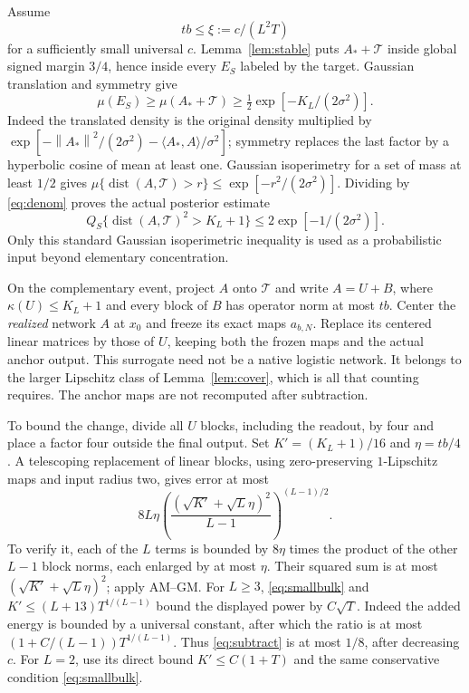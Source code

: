 \documentclass[11pt]{article}
\theoremstyle{remark}\newtheorem{remark}[theorem]{Remark}
\newcommand{\norm}[1]{\left\lVert #1\right\rVert}
\begin{document}
Assume
\begin{equation}\label{eq:smallbulk}
 tb\le\xi:=c/(L^2T)
\end{equation}
for a sufficiently small universal $c$. Lemma~\ref{lem:stable} puts
$A_*+\mathcal T$ inside global signed margin $3/4$, hence inside every
$E_S$ labeled by the target. Gaussian translation and symmetry give
\begin{equation}\label{eq:denom}
 \mu(E_S)\ge\mu(A_*+\mathcal T)
 \ge\tfrac12\exp[-K_L/(2\sigma^2)].
\end{equation}
Indeed the translated density is the original density multiplied by
$\exp[-\norm{A_*}^2/(2\sigma^2)-\langle A_*,A\rangle/\sigma^2]$;
symmetry replaces the last factor by a hyperbolic cosine of mean at least
one. Gaussian isoperimetry for a set of mass at least $1/2$ gives
$\mu\{\operatorname{dist}(A,\mathcal T)>r\}\le\exp[-r^2/(2\sigma^2)]$.
Dividing by \eqref{eq:denom} proves the actual posterior estimate
\begin{equation}\label{eq:distance}
 Q_S\{\operatorname{dist}(A,\mathcal T)^2>K_L+1\}
 \le2\exp[-1/(2\sigma^2)].
\end{equation}
Only this standard Gaussian isoperimetric inequality is used as a
probabilistic input beyond elementary concentration.

On the complementary event, project $A$ onto $\mathcal T$ and write
$A=U+B$, where $\kappa(U)\le K_L+1$ and every block of $B$ has operator
norm at most $tb$. Center the \emph{realized} network $A$ at $x_0$ and
freeze its exact maps $a_{b,N}$. Replace its centered linear matrices by
those of $U$, keeping both the frozen maps and the actual anchor output.
This surrogate need not be a native logistic network. It belongs to the
larger Lipschitz class of Lemma~\ref{lem:cover}, which is all that counting
requires. The anchor maps are not recomputed after subtraction.

To bound the change, divide all $U$ blocks, including the readout, by four
and place a factor four outside the final output. Set
$K'=(K_L+1)/16$ and $\eta=tb/4$. A telescoping replacement of linear
blocks, using zero-preserving $1$-Lipschitz maps and input radius two,
gives error at most
\begin{equation}\label{eq:subtract}
 8L\eta
 \left(\frac{(\sqrt{K'}+\sqrt L\eta)^2}{L-1}\right)^{(L-1)/2}.
\end{equation}
To verify it, each of the $L$ terms is bounded by $8\eta$ times the
product of the other $L-1$ block norms, each enlarged by at most $\eta$.
Their squared sum is at most $(\sqrt{K'}+\sqrt L\eta)^2$; apply AM--GM.
For $L\ge3$, \eqref{eq:smallbulk} and
$K'\le(L+13)T^{1/(L-1)}$ bound the displayed power by $C\sqrt T$.
Indeed the added energy is bounded by a universal constant, after which
the ratio is at most $(1+C/(L-1))T^{1/(L-1)}$.
Thus \eqref{eq:subtract} is at most $1/8$, after decreasing $c$.
For $L=2$, use its direct bound $K'\le C(1+T)$ and the same conservative
condition \eqref{eq:smallbulk}.
\end{document}
